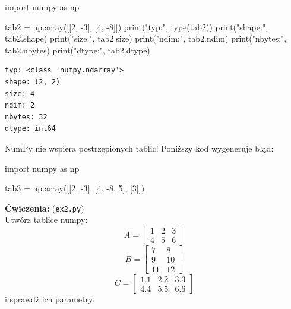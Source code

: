\documentclass[
  polish,
  letterpaper,
  DIV=11,
  numbers=noendperiod]{scrreprt}
\newenvironment{Shaded}{\begin{snugshade}}{\end{snugshade}}
\newcommand{\BuiltInTok}[1]{\textcolor[rgb]{0.00,0.23,0.31}{#1}}
\newcommand{\DecValTok}[1]{\textcolor[rgb]{0.68,0.00,0.00}{#1}}
\newcommand{\ImportTok}[1]{\textcolor[rgb]{0.00,0.46,0.62}{#1}}
\newcommand{\NormalTok}[1]{\textcolor[rgb]{0.00,0.23,0.31}{#1}}
\newcommand{\OperatorTok}[1]{\textcolor[rgb]{0.37,0.37,0.37}{#1}}
\newcommand{\StringTok}[1]{\textcolor[rgb]{0.13,0.47,0.30}{#1}}
\begin{document}
\begin{Shaded}
\begin{Highlighting}[]
\ImportTok{import}\NormalTok{ numpy }\ImportTok{as}\NormalTok{ np}

\NormalTok{tab2 }\OperatorTok{=}\NormalTok{ np.array([[}\DecValTok{2}\NormalTok{, }\OperatorTok{{-}}\DecValTok{3}\NormalTok{], [}\DecValTok{4}\NormalTok{, }\OperatorTok{{-}}\DecValTok{8}\NormalTok{]])}
\BuiltInTok{print}\NormalTok{(}\StringTok{"typ:"}\NormalTok{, }\BuiltInTok{type}\NormalTok{(tab2))}
\BuiltInTok{print}\NormalTok{(}\StringTok{"shape:"}\NormalTok{, tab2.shape)}
\BuiltInTok{print}\NormalTok{(}\StringTok{"size:"}\NormalTok{, tab2.size)}
\BuiltInTok{print}\NormalTok{(}\StringTok{"ndim:"}\NormalTok{, tab2.ndim)}
\BuiltInTok{print}\NormalTok{(}\StringTok{"nbytes:"}\NormalTok{, tab2.nbytes)}
\BuiltInTok{print}\NormalTok{(}\StringTok{"dtype:"}\NormalTok{, tab2.dtype)}
\end{Highlighting}
\end{Shaded}

\begin{verbatim}
typ: <class 'numpy.ndarray'>
shape: (2, 2)
size: 4
ndim: 2
nbytes: 32
dtype: int64
\end{verbatim}

NumPy nie wspiera postrzępionych tablic! Poniższy kod wygeneruje błąd:

\begin{Shaded}
\begin{Highlighting}[]
\ImportTok{import}\NormalTok{ numpy }\ImportTok{as}\NormalTok{ np}

\NormalTok{tab3 }\OperatorTok{=}\NormalTok{ np.array([[}\DecValTok{2}\NormalTok{, }\OperatorTok{{-}}\DecValTok{3}\NormalTok{], [}\DecValTok{4}\NormalTok{, }\OperatorTok{{-}}\DecValTok{8}\NormalTok{, }\DecValTok{5}\NormalTok{], [}\DecValTok{3}\NormalTok{]])}
\end{Highlighting}
\end{Shaded}

\textbf{Ćwiczenia:} (\texttt{ex2.py})\\
Utwórz tablice numpy: \[
A = \begin{bmatrix} 1 & 2 & 3 \\ 4 & 5 & 6 \end{bmatrix}
\] \[B = \begin{bmatrix} 7 & 8 \\ 9 & 10 \\ 11 & 12 \end{bmatrix}\]
\[C = \begin{bmatrix} 1.1 & 2.2 & 3.3 \\ 4.4 & 5.5 & 6.6 \end{bmatrix}\]
i sprawdź ich parametry.
\end{document}

